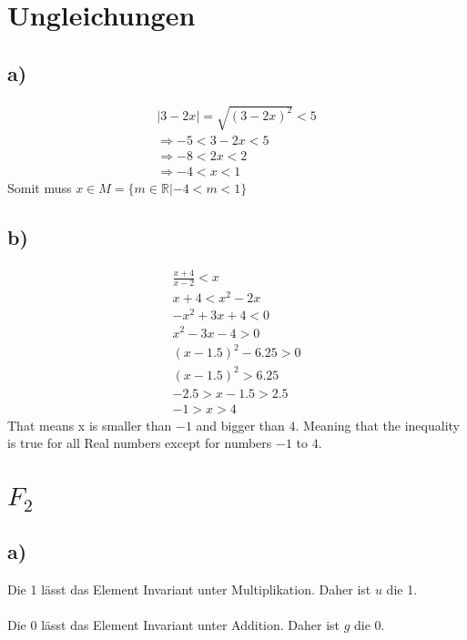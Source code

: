 \documentclass[]{scrartcl}
\begin{document}
\section{Ungleichungen}
\subsection{a)}
\begin{gather}
	|3-2x| = \sqrt{(3-2x)^2} < 5\\
	\Rightarrow -5 < 3-2x < 5\\
	\Rightarrow -8 < 2x < 2\\
	\Rightarrow -4<x<1
\end{gather}
Somit muss $x\in M = \{m\in\mathbb{R}| -4 < m < 1\}$

\subsection{b)}

\begin{gather}
	\frac{x+4}{x-2} < x\\
	x+ 4 < x^2 - 2x\\
	-x^2 + 3x + 4 < 0\\
	x^2 - 3x - 4 > 0\\
	(x - 1.5)^2 - 6.25 > 0\\
	(x -1.5)^2 > 6.25\\
	-2.5 > x-1.5 > 2.5\\
	-1 > x > 4
\end{gather}
That means x is smaller than $-1$ and bigger than $4$. Meaning that the inequality is true for all Real numbers except for numbers $-1$ to $4$.



\section{$F_2$}
\subsection{a)}

Die 1 lässt das Element Invariant unter Multiplikation. Daher ist $u$ die 1.\\\\
Die 0 lässt das Element Invariant unter Addition. Daher ist $g$ die 0.
\end{document}

